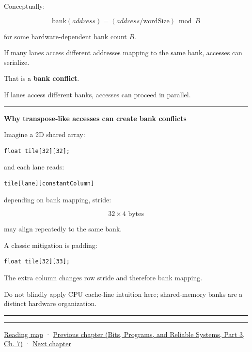 Conceptually:

\[
\text{bank}(address)
=
(address/\text{wordSize})\bmod B
\]

for some hardware-dependent bank count \(B\).

If many lanes access different addresses mapping to the same bank, accesses can serialize.

That is a \textbf{bank conflict}.

If lanes access different banks, accesses can proceed in parallel.

\begin{center}\rule{0.5\linewidth}{0.5pt}\end{center}

\textbf{Why transpose-like accesses can create bank conflicts}

Imagine a 2D shared array:

\protect{}\label{32aupj}%
\begin{verbatim}
float tile[32][32];
\end{verbatim}

and each lane reads:

\protect{}\label{dov08i}%
\begin{verbatim}
tile[lane][constantColumn]
\end{verbatim}

depending on bank mapping, stride:

\[
32\times4\text{ bytes}
\]

may align repeatedly to the same bank.

A classic mitigation is padding:

\protect{}\label{ucsz3u}%
\begin{verbatim}
float tile[32][33];
\end{verbatim}

The extra column changes row stride and therefore bank mapping.

Do not blindly apply CPU cache-line intuition here; shared-memory banks are a distinct hardware organization.

\begin{center}\rule{0.5\linewidth}{0.5pt}\end{center}

\begin{center}\rule{0.5\linewidth}{0.5pt}\end{center}

\hyperref[volume-reading-map]{Reading map} · \href{../01-Bits-Programs-and-Reliable-Systems-P03/main.pdf\#nameddest=01-foundations-i-ch007-typed-interfaces-identity-and-data-structures}{Previous chapter (Bits, Programs, and Reliable Systems, Part 3, Ch. 7)} · \hyperref[01-foundations-i-ch009-gpu-memory-divergence-atomics-and-ordering]{Next chapter}
